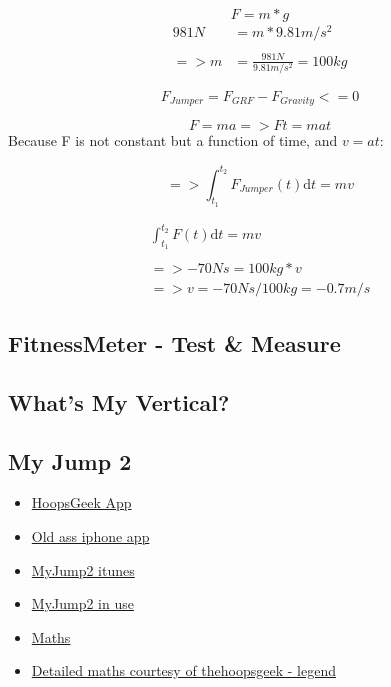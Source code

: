 \[\displaystyle F = m * g\]
\[
	\displaystyle
	\begin{aligned}
	981 N &= m * 9.81 m/s^2 \\ \\
	=> m &= \frac{981N}{9.81 m/s^2} = 100kg
	\end{aligned}	
\]

$$F_{Jumper} = F_{GRF} - F_{Gravity} <=0$$

\[F = m a => F t = m a t
\]
Because F is not constant but a function of time, and $v =a t$:
\par
$$\displaystyle
=> \int_{t_1}^{t_2} F_{Jumper}(t) \mathrm{d}t = m v$$

\[\displaystyle
\begin{aligned}
\int_{t_1}^{t_2} F(t) \mathrm{d}t = m v\\ \\
=> -70 N s = 100kg * v\\
=> v = -70 N s / 100kg = -0.7 m/s
\end{aligned}
\]


\subsection{FitnessMeter - Test \& Measure}
\label{research:fitness-meter}
\subsection{What's My Vertical?}
\label{research:whats-my-vert}
\subsection{My Jump 2}
\label{research:my-jump}


\begin{itemize}
	\item \href{https://www.thehoopsgeek.com/measurement-app/#manual}{HoopsGeek App}
	\item \href{https://apps.apple.com/us/app/fitnessmeter-test-measure/id477488986}{Old ass iphone app}
	\item \href{https://apps.apple.com/gb/app/my-jump-2/id1148617550#?platform=iphone}{MyJump2 itunes}
	\item \href{https://www.youtube.com/watch?v=tIBiHDyev6w}{MyJump2 in use}
	\item \href{https://www.topendsports.com/testing/products/vertical-jump/video.htm}{Maths}
	\item \href{https://www.thehoopsgeek.com/the-physics-of-the-vertical-jump/}{Detailed maths courtesy of thehoopsgeek - legend}
\end{itemize}